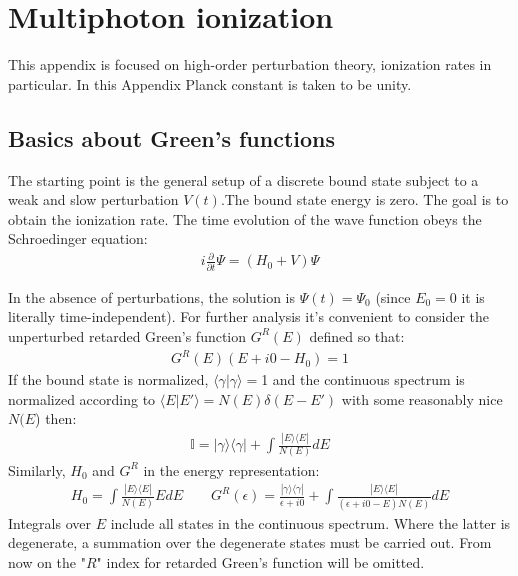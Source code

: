 \chapter{Multiphoton ionization} 
\label{app:multiphoton ionization}
This appendix is focused on high-order perturbation theory, ionization rates in particular. In this Appendix Planck constant is taken to be unity.

\section{Basics about Green's functions}

The starting point is the general setup of a discrete bound state subject to a weak and slow perturbation $ V(t) $.The bound state energy is zero. The goal is to obtain the ionization rate. The time evolution of the wave function obeys the Schroedinger equation:
\begin{gather}
\label{shr_eq_general}
	i\frac{\partial}{\partial t}\Psi=(H_{0}+V)\Psi
\end{gather}

In the absence of perturbations, the solution is $ \Psi(t)=\Psi_{0} $ (since $ E_{0}=0 $ it is literally time-independent). For further analysis it's convenient to consider the unperturbed retarded Green's function $ G^{R}(E) $ defined so that:
\begin{gather}
\label{green_function_def}
	G^{R}(E)(E+i0-H_{0})=1
\end{gather}
If the bound state is normalized, $ \langle\gamma|\gamma\rangle= $1 and the continuous spectrum is normalized according to $ \langle E|E'\rangle=N(E)\delta(E-E') $ with some reasonably nice $ N(E $) then:
\begin{gather}
\mathbb{I}=|\gamma\rangle\langle\gamma|+\int\frac{|E\rangle\langle E|}{N(E)}dE
\end{gather}
Similarly, $ H_{0} $ and $ G^{R} $ in the energy representation:
\begin{gather}
	H_{0}=\int\frac{|E\rangle\langle E|}{N(E)}EdE
	\qquad
	G^{R}(\epsilon)=\frac{|\gamma\rangle\langle\gamma|}{\epsilon+i0}+\int\frac{|E\rangle\langle E|}{(\epsilon+i0-E)N(E)}dE
\end{gather}
Integrals over $ E $ include all states in the continuous spectrum. Where the latter is degenerate, a summation over the degenerate states must be carried out. From now on the "$ R $" index for retarded Green's function will be omitted.

